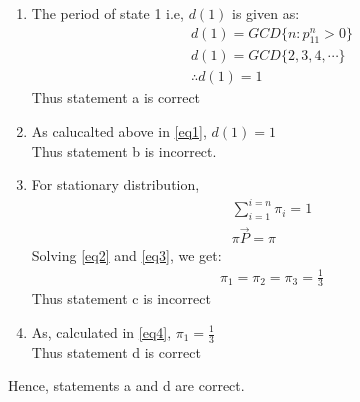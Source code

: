 \documentclass[journal,12pt,twocolumn]{IEEEtran}
\begin{document}
    \begin{enumerate}
    \item{ The period of state 1 i.e, $d(1)$ is given as:
    \begin{align}
    d(1)=GCD\{n : p_{11}^n > 0\}\\
    d(1)=GCD\{2,3,4,\cdots\}\\
    \therefore d(1)=1 \label{eq1}
    \end{align}
    Thus statement a is correct}\\
    \item{As calucalted above in \ref{eq1}, $d(1)=1$\\
    Thus statement b is incorrect.}\\
    \item{For stationary distribution,
    \begin{align}
    \sum_{i=1}^{i=n} \pi_i = 1 \label{eq2}\\
    \pi   \vec{P} = \pi \label{eq3}      
    \end{align}
    Solving \ref{eq2} and \ref{eq3}, we get:
    \begin{align}
    \pi_1=\pi_2=\pi_3=\frac{1}{3} \label{eq4}
    \end{align}
    Thus statement c is incorrect
    }\\
    \item{As, calculated in \ref{eq4}, $\pi_1=\frac{1}{3}$\\
    Thus statement d is correct}
    \end{enumerate}
Hence, statements a and d are correct.
\end{document}
